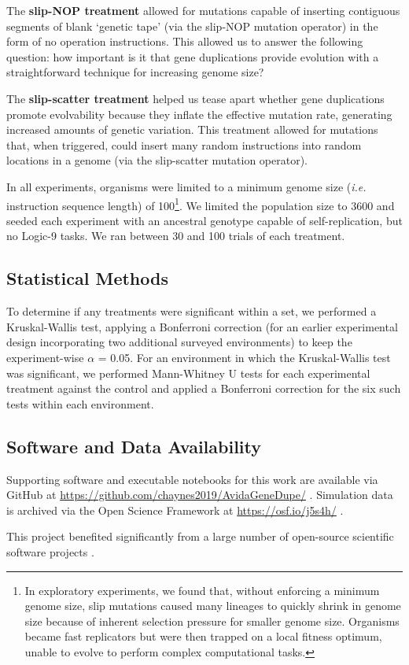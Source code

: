 The \textbf{slip-NOP treatment} allowed for mutations capable of inserting contiguous segments of blank `genetic tape' (via the slip-NOP mutation operator) in the form of no operation instructions. This allowed us to answer the following question: how important is it that gene duplications provide evolution with a straightforward technique for increasing genome size?

The \textbf{slip-scatter treatment} helped us tease apart whether gene duplications promote evolvability because they inflate the effective mutation rate, generating increased amounts of genetic variation. This treatment allowed for mutations that, when triggered, could insert many random instructions into random locations in a genome (via the slip-scatter mutation operator).

In all experiments, organisms were limited to a minimum genome size (\textit{i.e.} instruction sequence length) of 100\footnote{
In exploratory experiments, we found that, without enforcing a minimum genome size, slip mutations caused many lineages to quickly shrink in genome size because of inherent selection pressure for smaller genome size. Organisms became fast replicators but were then trapped on a local fitness optimum, unable to evolve to perform complex computational tasks.
}.
We limited the population size to 3600 and seeded each experiment with an ancestral genotype capable of self-replication, but no Logic-9 tasks.
We ran between 30 and 100 trials of each treatment.

\subsection{Statistical Methods}

To determine if any treatments were significant within a set, we performed a Kruskal-Wallis test, applying a Bonferroni correction (for an earlier experimental design incorporating two additional surveyed environments) to keep the experiment-wise $\alpha$ = 0.05.
For an environment in which the Kruskal-Wallis test was significant, we performed Mann-Whitney U tests for each experimental treatment against the control and applied a Bonferroni correction for the six such tests within each environment.

\subsection{Software and Data Availability} \label{sec:materials}

Supporting software and executable notebooks for this work are available via GitHub at \url{https://github.com/chaynes2019/AvidaGeneDupe/} \citep{david_m_bryson_2025_14911296}.
Simulation data is archived via the Open Science Framework at \url{https://osf.io/j5s4h/} \citep{foster2017open}.

This project benefited significantly from a large number of open-source scientific software projects \citep{2020SciPy-NMeth,harris2020array,reback2020pandas,mckinney-proc-scipy-2010,waskom2021seaborn,hunter2007matplotlib,moreno2023teeplot,r_core_team_r:_2015}.
